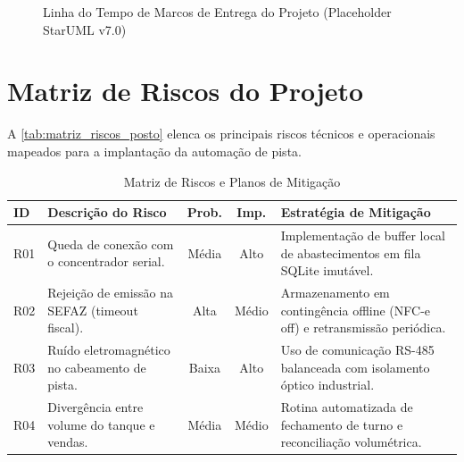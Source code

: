 \begin{figure}[htbp]
    \centering
    \caption{Linha do Tempo de Marcos de Entrega do Projeto (Placeholder StarUML v7.0)}
    \label{fig:gantt_marcos}
\end{figure}

\section{Matriz de Riscos do Projeto}

A \autoref{tab:matriz_riscos_posto} elenca os principais riscos técnicos e operacionais mapeados para a implantação da automação de pista.

\begin{table}[htbp]
\caption{Matriz de Riscos e Planos de Mitigação}
\label{tab:matriz_riscos_posto}
\centering
\small
\begin{tabularx}{\textwidth}{@{} l l c c Y @{}}
\toprule
\textbf{ID} & \textbf{Descrição do Risco} & \textbf{Prob.} & \textbf{Imp.} & \textbf{Estratégia de Mitigação} \\
\midrule
R01 & Queda de conexão com o concentrador serial. & Média & Alto & Implementação de buffer local de abastecimentos em fila SQLite imutável. \\
R02 & Rejeição de emissão na SEFAZ (timeout fiscal). & Alta & Médio & Armazenamento em contingência offline (NFC-e off) e retransmissão periódica. \\
R03 & Ruído eletromagnético no cabeamento de pista. & Baixa & Alto & Uso de comunicação RS-485 balanceada com isolamento óptico industrial. \\
R04 & Divergência entre volume do tanque e vendas. & Média & Médio & Rotina automatizada de fechamento de turno e reconciliação volumétrica. \\
\bottomrule
\end{tabularx}
\end{table}
